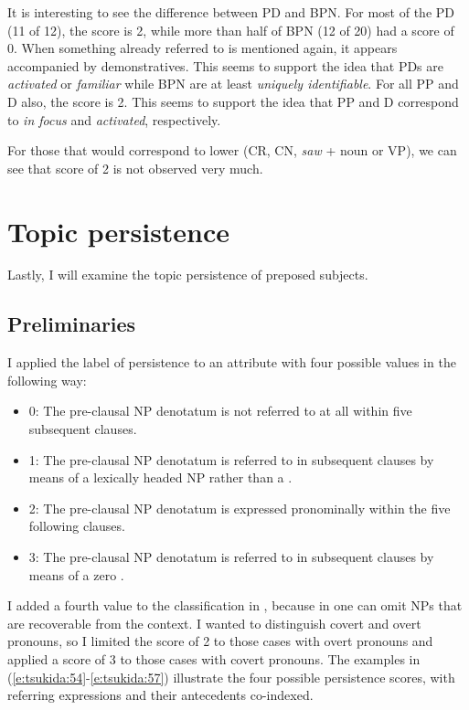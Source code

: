 \documentclass[output=paper
,modfonts
,nonflat]{langsci/langscibook}
\begin{document}
\noindent
It is interesting to see the  difference between PD and BPN. For most of the PD (11 of 12), the  score is 2, while more than half of BPN (12 of 20) had a score of 0. When something already referred to is mentioned again, it appears accompanied by demonstratives. This seems to support the idea that PDs are \textit{activated} or \textit{familiar} while BPN are at least \textit{uniquely identifiable}. For all PP and D also, the  score is 2. This seems to support the idea that PP and D correspond to \textit{in focus} and \textit{activated}, respectively. 

For those that would correspond to lower  (CR, CN, \textit{saw} + noun or VP), we can see that score of 2 is not observed very much. 

\section{\label{s:tsukida:5}Topic persistence}

Lastly, I will examine the topic persistence of preposed subjects.

\subsection{\label{s:tsukida:5.1}Preliminaries}

I applied the label of persistence to an attribute with four possible values in the following way:

\begin{itemize}
	\item 0: The pre-clausal NP denotatum is not referred to at all within five subsequent clauses.
	\item 1: The pre-clausal NP denotatum is referred to in subsequent clauses by means of a lexically headed NP rather than a .
	\item 2: The pre-clausal NP denotatum is expressed pronominally within the five following clauses.
	\item 3: The pre-clausal NP denotatum is referred to in subsequent clauses by means of a zero .
\end{itemize}

\noindent
I added a fourth value to the classification in \citet[1689]{Gregory2001}, because in  one can omit NPs that are recoverable from the context. I wanted to distinguish covert and overt pronouns, so I limited the score of 2 to those cases with overt pronouns and applied a score of 3 to those cases with covert pronouns. The examples in (\ref{e:tsukida:54}-\ref{e:tsukida:57}) illustrate the four possible persistence scores, with referring expressions and their antecedents co-indexed.
\end{document}
